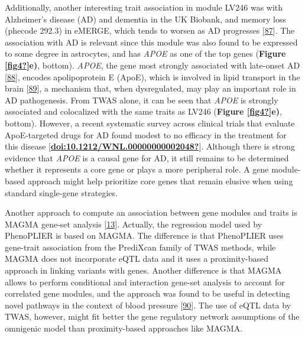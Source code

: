 Additionally, another interesting trait association in module LV246 was with Alzheimer's disease (AD) and dementia in the UK Biobank, and memory loss (phecode 292.3) in eMERGE, which tends to worsen as AD progresses {[}\protect\hyperlink{ref-Vxi0ejah}{87}{]}.
The association with AD is relevant since this module was also found to be expressed to some degree in astrocytes, and has \emph{APOE} as one of the top genes (\textbf{Figure {[}\protect\hyperlink{ref-fig4}{\textbf{fig4?}}{]}e)}, bottom).
\emph{APOE}, the gene most strongly associated with late-onset AD {[}\protect\hyperlink{ref-hn3T60wf}{88}{]}, encodes apolipoprotein E (ApoE), which is involved in lipid transport in the brain {[}\protect\hyperlink{ref-10ZgydXh1}{89}{]}, a mechanism that, when dysregulated, may play an important role in AD pathogenesis.
From TWAS alone, it can be seen that \emph{APOE} is strongly associated and colocalized with the same traits as LV246 (\textbf{Figure {[}\protect\hyperlink{ref-fig4}{\textbf{fig4?}}{]}e)}, bottom).
However, a recent systematic survey across clinical trials that evaluate ApoE-targeted drugs for AD found modest to no efficacy in the treatment for this disease {[}\protect\hyperlink{ref-doi:10.1212ux2fWNL.00000000002048}{\textbf{doi:10.1212/WNL.00000000002048?}}{]}.
Although there is strong evidence that \emph{APOE} is a causal gene for AD, it still remains to be determined whether it represents a core gene or plays a more peripheral role.
A gene module-based approach might help prioritize core genes that remain elusive when using standard single-gene strategies.

Another approach to compute an association between gene modules and traits is MAGMA gene-set analysis {[}\protect\hyperlink{ref-19XiXgYmd}{13}{]}.
Actually, the regression model used by PhenoPLIER is based on MAGMA.
The difference is that PhenoPLIER uses gene-trait association from the PrediXcan family of TWAS methods, while MAGMA does not incorporate eQTL data and it uses a proximity-based approach in linking variants with genes.
Another difference is that MAGMA allows to perform conditional and interaction gene-set analysis to account for correlated gene modules, and the approach was found to be useful in detecting novel pathways in the context of blood pressure {[}\protect\hyperlink{ref-Om8ZhS06}{90}{]}.
The use of eQTL data by TWAS, however, might fit better the gene regulatory network assumptions of the omnigenic model than proximity-based approaches like MAGMA.

